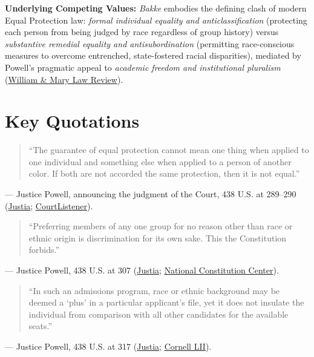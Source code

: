 \documentclass[12pt]{article}
\begin{document}
\textbf{Underlying Competing Values:} \textit{Bakke} embodies the defining clash of modern Equal Protection law: \textit{formal individual equality and anticlassification} (protecting each person from being judged by race regardless of group history) versus \textit{substantive remedial equality and antisubordination} (permitting race-conscious measures to overcome entrenched, state-fostered racial disparities), mediated by Powell's pragmatic appeal to \textit{academic freedom and institutional pluralism} (\href{https://scholarship.law.wm.edu/cgi/viewcontent.cgi?article=3958&context=wmlr}{William \& Mary Law Review}).

\section{Key Quotations}
\begin{quote}
``The guarantee of equal protection cannot mean one thing when applied to one individual and something else when applied to a person of another color. If both are not accorded the same protection, then it is not equal.''
\end{quote}
\noindent --- Justice Powell, announcing the judgment of the Court, 438 U.S. at 289--290 (\href{https://supreme.justia.com/cases/federal/us/438/265/}{Justia}; \href{https://www.courtlistener.com/opinion/109930/regents-of-the-university-of-california-v-bakke/}{CourtListener}).

\begin{quote}
``Preferring members of any one group for no reason other than race or ethnic origin is discrimination for its own sake. This the Constitution forbids.''
\end{quote}
\noindent --- Justice Powell, 438 U.S. at 307 (\href{https://supreme.justia.com/cases/federal/us/438/265/}{Justia}; \href{https://constitutioncenter.org/the-constitution/supreme-court-case-library/university-of-california-v-bakke}{National Constitution Center}).

\begin{quote}
``In such an admissions program, race or ethnic background may be deemed a `plus' in a particular applicant's file, yet it does not insulate the individual from comparison with all other candidates for the available seats.''
\end{quote}
\noindent --- Justice Powell, 438 U.S. at 317 (\href{https://supreme.justia.com/cases/federal/us/438/265/}{Justia}; \href{https://www.law.cornell.edu/supremecourt/text/438/265}{Cornell LII}).
\end{document}
